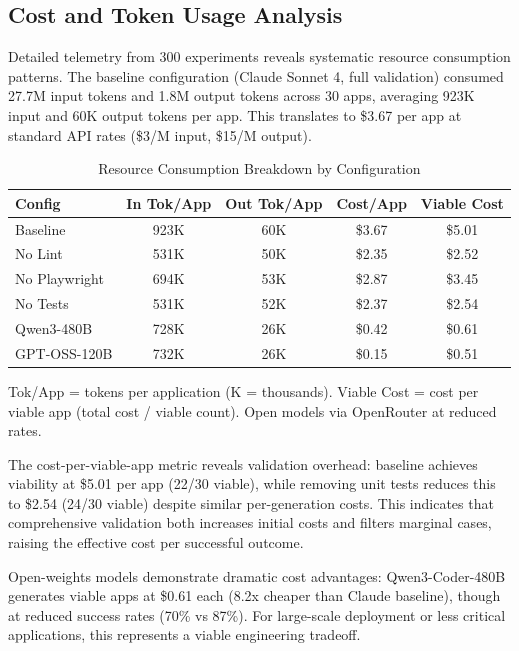 \documentclass[conference]{IEEEtran}
\begin{document}
\subsection{Cost and Token Usage Analysis}

Detailed telemetry from 300 experiments reveals systematic resource consumption patterns. The baseline configuration (Claude Sonnet 4, full validation) consumed 27.7M input tokens and 1.8M output tokens across 30 apps, averaging 923K input and 60K output tokens per app. This translates to \$3.67 per app at standard API rates (\$3/M input, \$15/M output).

\begin{table}[!t]
\caption{Resource Consumption Breakdown by Configuration}
\label{tab:cost-token-breakdown}
\centering
\small
\begin{threeparttable}
\begin{tabular}{@{}lcccc@{}}
\toprule
\textbf{Config} & \textbf{In Tok/App} & \textbf{Out Tok/App} & \textbf{Cost/App} & \textbf{Viable Cost} \\
\midrule
Baseline & 923K & 60K & \$3.67 & \$5.01 \\
No Lint & 531K & 50K & \$2.35 & \$2.52 \\
No Playwright & 694K & 53K & \$2.87 & \$3.45 \\
No Tests & 531K & 52K & \$2.37 & \$2.54 \\
\midrule
Qwen3-480B & 728K & 26K & \$0.42 & \$0.61 \\
GPT-OSS-120B & 732K & 26K & \$0.15 & \$0.51 \\
\bottomrule
\end{tabular}
\begin{tablenotes}\footnotesize
\item Tok/App = tokens per application (K = thousands). Viable Cost = cost per viable app (total cost / viable count). Open models via OpenRouter at reduced rates.
\end{tablenotes}
\end{threeparttable}
\end{table}

The cost-per-viable-app metric reveals validation overhead: baseline achieves viability at \$5.01 per app (22/30 viable), while removing unit tests reduces this to \$2.54 (24/30 viable) despite similar per-generation costs. This indicates that comprehensive validation both increases initial costs and filters marginal cases, raising the effective cost per successful outcome.

Open-weights models demonstrate dramatic cost advantages: Qwen3-Coder-480B generates viable apps at \$0.61 each (8.2x cheaper than Claude baseline), though at reduced success rates (70\% vs 87\%). For large-scale deployment or less critical applications, this represents a viable engineering tradeoff.
\end{document}
